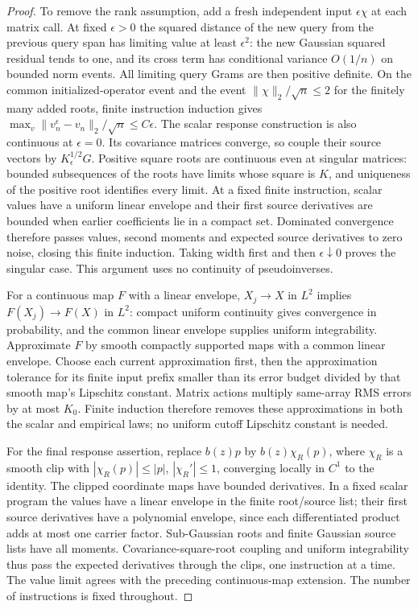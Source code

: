 \begin{proof}
To remove the rank assumption, add a fresh independent input
$\epsilon\chi$ at each matrix call.  At fixed $\epsilon>0$ the squared
distance of the new query from the previous query span has limiting
value at least $\epsilon^2$: the new Gaussian squared residual tends
to one, and its cross term has conditional variance $O(1/n)$ on
bounded norm events.  All limiting query Grams are then positive definite.
On the common initialized-operator event and the event
$\|\chi\|_2/\sqrt n\le2$ for the finitely many added roots, finite
instruction induction gives
$\max_v\|v_n^\epsilon-v_n\|_2/\sqrt n\le C\epsilon$.
The scalar response construction is also continuous at $\epsilon=0$.
Its covariance matrices converge, so couple their source vectors by
$K_\epsilon^{1/2}G$.  Positive square roots are continuous even at
singular matrices: bounded subsequences of the roots have limits whose
square is $K$, and uniqueness of the positive root identifies every
limit.  At a fixed finite instruction, scalar values have a uniform
linear envelope and their first source derivatives are bounded when
earlier coefficients lie in a compact set.  Dominated convergence
therefore passes values, second moments and expected source derivatives
to zero noise, closing this finite induction.  Taking width first and
then $\epsilon\downarrow0$ proves the singular case.  This argument
uses no continuity of pseudoinverses.

For a continuous map $F$ with a linear envelope, $X_j\to X$ in $L^2$
implies $F(X_j)\to F(X)$ in $L^2$: compact uniform continuity gives
convergence in probability, and the common linear envelope supplies
uniform integrability.  Approximate $F$ by smooth compactly supported
maps with a common linear envelope.  Choose each current approximation
first, then the approximation tolerance for its finite input prefix
smaller than its error budget divided by that smooth map's Lipschitz
constant.  Matrix actions multiply same-array RMS errors by at most
$K_0$.  Finite induction therefore removes these approximations in both
the scalar and empirical laws; no uniform cutoff Lipschitz constant is
needed.

For the final response assertion, replace $b(z)p$ by
$b(z)\chi_R(p)$, where $\chi_R$ is a smooth clip with
$|\chi_R(p)|\le|p|$, $|\chi_R'|\le1$, converging locally in $C^1$ to
the identity.  The clipped coordinate maps have bounded derivatives.
In a fixed scalar program the values have a linear envelope in the finite
root/source list; their first source derivatives have a polynomial
envelope, since each differentiated product adds at most one carrier
factor.  Sub-Gaussian roots and finite Gaussian source lists have all
moments.  Covariance-square-root coupling and uniform integrability thus
pass the expected derivatives through the clips, one instruction at a
time.  The value limit agrees with the preceding continuous-map
extension.  The number of instructions is fixed throughout.
\end{proof}

